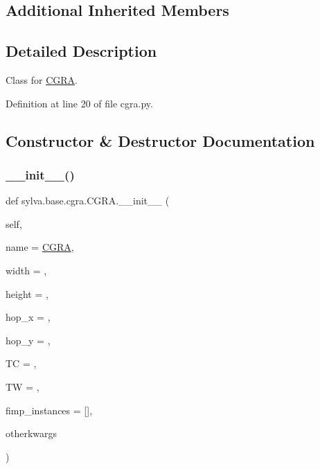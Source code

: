 \subsection*{Additional Inherited Members}


\subsection{Detailed Description}
Class for \hyperlink{classsylva_1_1base_1_1cgra_1_1_c_g_r_a}{C\+G\+RA}. 



Definition at line 20 of file cgra.\+py.



\subsection{Constructor \& Destructor Documentation}
\mbox{\label{classsylva_1_1base_1_1cgra_1_1_c_g_r_a_a688cf81ea7c4ca525407bde916e47449}} 
\subsubsection{\texorpdfstring{\+\_\+\+\_\+init\+\_\+\+\_\+()}{\_\_init\_\_()}}
{\footnotesize\ttfamily def sylva.\+base.\+cgra.\+C\+G\+R\+A.\+\_\+\+\_\+init\+\_\+\+\_\+ (\begin{DoxyParamCaption}\item[{}]{self,  }\item[{}]{name = {\ttfamily \textquotesingle{}\hyperlink{classsylva_1_1base_1_1cgra_1_1_c_g_r_a}{C\+G\+RA}\textquotesingle{}},  }\item[{}]{width = {},  }\item[{}]{height = {},  }\item[{}]{hop\+\_\+x = {},  }\item[{}]{hop\+\_\+y = {},  }\item[{}]{TC = {},  }\item[{}]{TW = {},  }\item[{}]{fimp\+\_\+instances = {\ttfamily \mbox{[}\mbox{]}},  }\item[{}]{otherkwargs }\end{DoxyParamCaption})}



